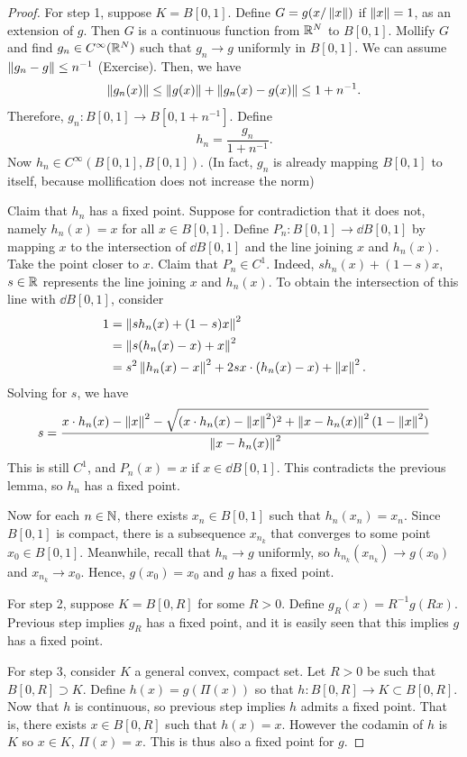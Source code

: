 \documentclass[a4paper]{article}
\begin{document}
\begin{proof}

  For step 1, suppose $K = B[0, 1]$. Define $G = g (x / \left\lVert x\right\rVert)$ if
  $\left\lVert x\right\rVert = 1$, as an extension of $g$. Then $G$ is a continuous
  function from $\mathbb{R}^N$ to $B[0, 1]$. Mollify $G$ and find $g_n \in
  C^\infty (\mathbb{R}^N)$ such that $g_n \to g$ uniformly in $B[0, 1]$. We can
  assume $\left\lVert g_n - g\right\rVert \leq n^{-1}$ (Exercise). Then, we have
  \[
    \left\lVert g_n (x)\right\rVert \leq \left\lVert g(x)\right\rVert + \left\lVert g_n(x) - g(x)\right\rVert \leq 1 + n^{-1}.
  \]
  Therefore, $g_n : B[0, 1] \to B[0, 1 + n^{-1}]$. Define
  \[
    h_n = \frac{g_n}{1 + n^{-1}}.
  \]
  Now $h_n \in C^\infty(B[0, 1], B[0, 1])$. (In fact, $g_n$ is already
  mapping $B[0, 1]$ to itself, because mollification does not increase the
  norm)

  Claim that $h_n$ has a fixed point. Suppose for contradiction that it
  does not, namely $h_n(x) = x$ for all $x \in B[0, 1]$. Define $P_n :
  B[0, 1] \to \dd B[0, 1]$ by mapping $x$ to the intersection of $\dd B[0,
  1]$ and the line joining $x$ and $h_n(x)$. Take the point closer to $x$.
  Claim that $P_n \in C^1$. Indeed, $s h_n(x) + (1 - s) x$, $s \in \mathbb{R}$
  represents the line joining $x$ and $h_n(x)$. To obtain the intersection
  of this line with $\dd B[0, 1]$, consider
  \begin{align*}
    1 & = \left\lVert s h_n(x) + (1 - s) x\right\rVert^2                                   \\
      & = \left\lVert s (h_n(x) - x) + x\right\rVert^2                                     \\
      & = s^2 \left\lVert h_n(x) - x\right\rVert^2 + 2s x \cdot (h_n(x) - x) + \left\lVert x\right\rVert^2.
  \end{align*}
  Solving for $s$, we have
  \[
    s = \frac{x \cdot h_n(x) - \left\lVert x\right\rVert^2 - \sqrt{(x \cdot h_n(x) - \left\lVert x\right\rVert^2)^2
        + \left\lVert x - h_n(x)\right\rVert^2 (1 - \left\lVert x\right\rVert^2)}}{\left\lVert x - h_n(x)\right\rVert^2}
  \]
  This is still $C^1$, and $P_n(x) = x$ if $x \in \dd B[0, 1]$. This
  contradicts the previous lemma, so $h_n$ has a fixed point.

  Now for each $n \in \mathbb{N}$, there exists $x_n \in B[0, 1]$ such that
  $h_n(x_n) = x_n$. Since $B[0, 1]$ is compact, there is a subsequence
  $x_{n_k}$ that converges to some point $x_0 \in B[0, 1]$. Meanwhile,
  recall that $h_n \to g$ uniformly, so $h_{n_k} (x_{n_k}) \to g(x_0)$ and
  $x_{n_k} \to x_0$. Hence, $g(x_0) = x_0$ and $g$ has a fixed point.

  For step 2, suppose $K = B[0, R]$ for some $R > 0$. Define $g_R (x) =
  R^{-1} g(R x)$. Previous step implies $g_R$ has a fixed point, and it is
  easily seen that this implies $g$ has a fixed point.

  For step 3, consider $K$ a general convex, compact set. Let $R > 0$ be
  such that $B[0, R] \supset K$. Define $h(x) = g (\Pi (x))$ so that $h :
  B[0, R] \to K \subset B[0, R]$. Now that $h$ is continuous, so previous
  step implies $h$ admits a fixed point. That is, there exists $x \in B[0,
  R]$ such that $h(x) = x$. However the codamin of $h$ is $K$ so $x \in
  K$, $\Pi (x) = x$. This is thus also a fixed point for $g$.
\end{proof}
\end{document}
